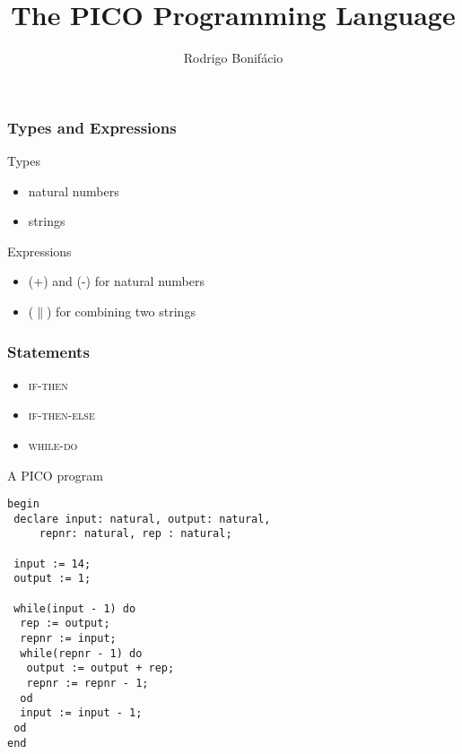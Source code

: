 \documentclass{beamer}
\title{The PICO Programming Language}
\author{Rodrigo Bonif\'{a}cio}
\begin{document}
\begin{frame}
\titlepage
\end{frame}



\begin{frame}
  \frametitle{Types and Expressions}

  \begin{block}{Types}
    \begin{itemize}
    \item natural numbers
    \item strings
    \end{itemize}
  \end{block}

  \begin{block}{Expressions}
    \begin{itemize}
    \item (+) and (-) for natural numbers
    \item ($\|$) for combining two strings  
    \end{itemize}
  \end{block}
\end{frame}

\begin{frame}
  \frametitle{Statements}

  \begin{itemize}
   \item \textsc{if-then} 
   \item \textsc{if-then-else}
   \item \textsc{while-do}  
  \end{itemize}
\end{frame}

\begin{frame}[fragile]
\begin{block}{A PICO program}  
\begin{scriptsize}
  \begin{lstlisting}[language=pico]
begin
 declare input: natural, output: natural,
     repnr: natural, rep : natural;

 input := 14;
 output := 1;

 while(input - 1) do
  rep := output;
  repnr := input;
  while(repnr - 1) do
   output := output + rep;
   repnr := repnr - 1;
  od
  input := input - 1;
 od
end
\end{lstlisting}
\end{scriptsize}
\end{block}
\end{frame}
\end{document}
